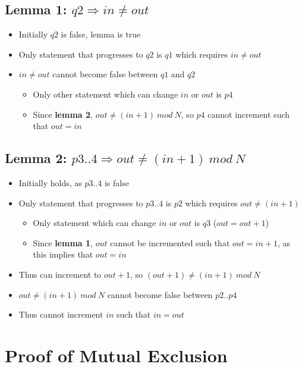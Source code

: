 \documentclass[12pt,a4paper]{article}
\begin{document}
\subsection*{\textbf{Lemma 1}: $q2 \Longrightarrow in \neq out$}
\begin{itemize}
    \item Initially $q2$ is false, lemma is true
    \item Only statement that progresses to $q2$ is $q1$ which requires $in \neq out$
    \item $in \neq out$ cannot become false between $q1$ and $q2$
    \begin{itemize}
        \item Only other statement which can change $in$ or $out$ is $p4$
        \item Since \textbf{lemma 2}, $out \neq (in + 1)\ mod\ N$, so $p4$ cannot increment such that $out = in$ 
    \end{itemize}
\end{itemize}

\subsection*{\textbf{Lemma 2}: $p3..4 \Longrightarrow out \neq (in+1)\ mod\ N$}
\begin{itemize}
    \item Initially holds, as $p3..4$ is false
    \item Only statement that progresses to $p3..4$ is $p2$ which requires $out \neq (in+1)$
    \begin{itemize}
        \item Only statement which can change $in$ or $out$ is $q3$ ($out = out + 1$)
        \item Since \textbf{lemma 1}, $out$ cannot be incremented such that $out = in+1$,
            as this implies that $out = in$
    \end{itemize}
    \item Thus can increment to $out+1$, so $(out+1) \neq (in+1)\ mod\ N$
    \item $out \neq (in + 1)\ mod\ N$ cannot become false between $p2..p4$
    \item Thus cannot increment $in$ such that $in = out$
\end{itemize}

\section{Proof of Mutual Exclusion}
\end{document}
